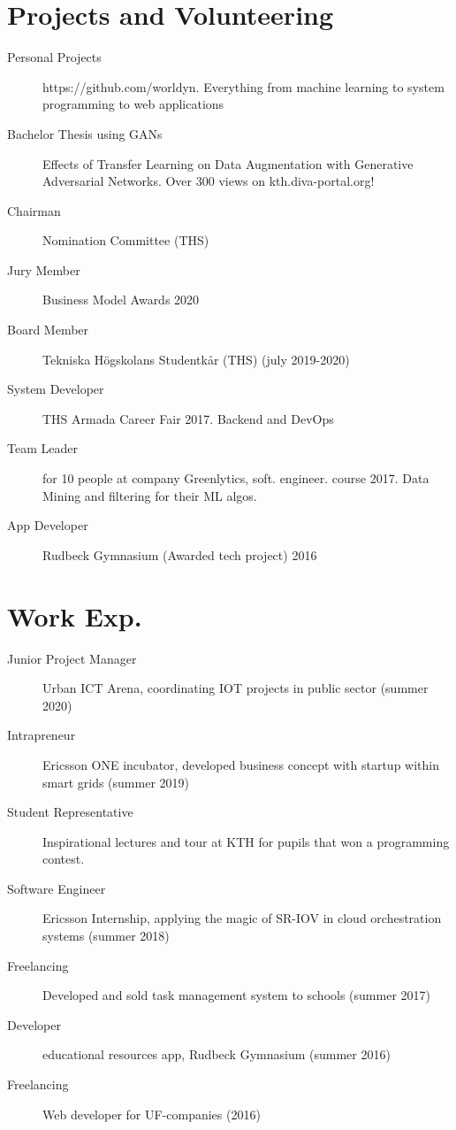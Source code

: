 \documentclass[margin,line,a4paper]{resume}
\begin{document}
\begin{resume}
\section{\mysidestyle Projects and Volunteering}\vspace{1mm}
\begin{description}
   \item[Personal Projects] https://github.com/worldyn. Everything from machine learning to system programming to web applications
    \item[Bachelor Thesis using GANs] Effects of Transfer Learning on Data Augmentation with Generative Adversarial Networks. Over 300 views on kth.diva-portal.org!
    \item[Chairman] Nomination Committee (THS)
    \item[Jury Member] Business Model Awards 2020 
    \item[Board Member] Tekniska Högskolans Studentkår (THS) (july 2019-2020)
    \item[System Developer] THS Armada Career Fair 2017. Backend and DevOps
    \item[Team Leader] for 10 people at company Greenlytics, soft. engineer. course 2017. Data Mining and filtering for their ML algos.
    \item[App Developer] Rudbeck Gymnasium (Awarded tech project) 2016

\end{description}  
  
\section{\mysidestyle Work Exp.}\vspace{1mm}
\begin{description}
   \item[Junior Project Manager] Urban ICT Arena, coordinating IOT projects in public sector (summer 2020)
    \item[Intrapreneur] Ericsson ONE incubator, developed business concept with startup within smart grids (summer 2019)
    \item[Student Representative] Inspirational lectures and tour at KTH for pupils that won a programming contest.
    \item[Software Engineer] Ericsson Internship, applying the magic of SR-IOV in cloud orchestration systems (summer 2018)
    \item[Freelancing] Developed and sold task management system to schools (summer 2017)
    \item[Developer] educational resources app, Rudbeck Gymnasium (summer 2016)
    \item[Freelancing] Web developer for UF-companies (2016)
\end{description}


\end{resume}
\end{document}
